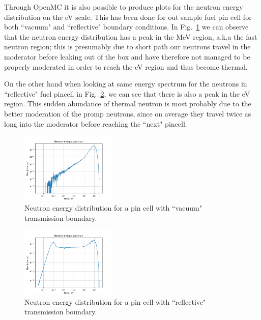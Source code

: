 \documentclass[twocolumn,a4paper,10pt]{article}
\begin{document}
\par
Through OpenMC it is also possible to produce plots for the neutron energy distribution on the eV scale. This has been done for out sample fuel pin cell for both ``vacuum" and ``reflective" boundary conditions. In Fig.~\ref{fig:pincellenergyvac} we can observe that the neutron energy distribution has a peak in the MeV region, a.k.a the fast neutron region; this is presumably due to short path our neutrons travel in the moderator before leaking out of the box and have therefore not managed to be properly moderated in order to reach the eV region and thus become thermal. \\
\par
On the other hand when looking at same energy spectrum for the neutrons in ``reflective" fuel pincell in Fig.~\ref{fig:pincellenergyref}, we can see that there is also a peak in the eV region. This sudden abundance of thermal neutron is most probably due to the better moderation of the promp neutrons, since on average they travel twice as long into the moderator before reaching the ``next" pincell.

\begin{figure}[ht]
  \centering
  \includegraphics[width=0.4\textwidth]{../Pin_Cell/Energy_Vacuum.png}
  \caption{Neutron energy distribution for a pin cell with ``vacuum" transmission boundary.}
  \label{fig:pincellenergyvac}
\end{figure}

\begin{figure}[ht]
  \centering
  \includegraphics[width=0.4\textwidth]{../Pin_Cell/Energy_Reflective.png}
  \caption{Neutron energy distribution for a pin cell with ``reflective" transmission boundary.}
  \label{fig:pincellenergyref}
\end{figure}
\end{document}

